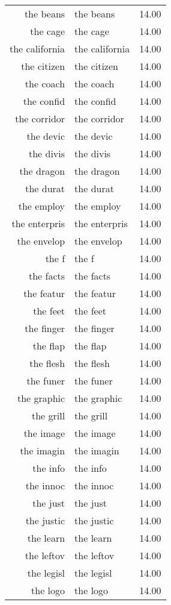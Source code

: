 \begin{table}[ht]
\begin{tabular}{rlr}
  the beans & the beans & 14.00 \\ 
  the cage & the cage & 14.00 \\ 
  the california & the california & 14.00 \\ 
  the citizen & the citizen & 14.00 \\ 
  the coach & the coach & 14.00 \\ 
  the confid & the confid & 14.00 \\ 
  the corridor & the corridor & 14.00 \\ 
  the devic & the devic & 14.00 \\ 
  the divis & the divis & 14.00 \\ 
  the dragon & the dragon & 14.00 \\ 
  the durat & the durat & 14.00 \\ 
  the employ & the employ & 14.00 \\ 
  the enterpris & the enterpris & 14.00 \\ 
  the envelop & the envelop & 14.00 \\ 
  the f & the f & 14.00 \\ 
  the facts & the facts & 14.00 \\ 
  the featur & the featur & 14.00 \\ 
  the feet & the feet & 14.00 \\ 
  the finger & the finger & 14.00 \\ 
  the flap & the flap & 14.00 \\ 
  the flesh & the flesh & 14.00 \\ 
  the funer & the funer & 14.00 \\ 
  the graphic & the graphic & 14.00 \\ 
  the grill & the grill & 14.00 \\ 
  the image & the image & 14.00 \\ 
  the imagin & the imagin & 14.00 \\ 
  the info & the info & 14.00 \\ 
  the innoc & the innoc & 14.00 \\ 
  the just & the just & 14.00 \\ 
  the justic & the justic & 14.00 \\ 
  the learn & the learn & 14.00 \\ 
  the leftov & the leftov & 14.00 \\ 
  the legisl & the legisl & 14.00 \\ 
  the logo & the logo & 14.00 \\ 

\end{tabular}
\end{table}
